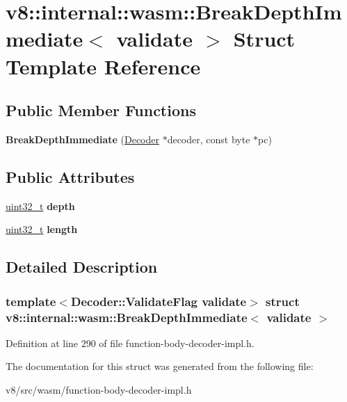 \hypertarget{structv8_1_1internal_1_1wasm_1_1BreakDepthImmediate}{}\section{v8\+:\+:internal\+:\+:wasm\+:\+:Break\+Depth\+Immediate$<$ validate $>$ Struct Template Reference}
\label{structv8_1_1internal_1_1wasm_1_1BreakDepthImmediate}
\subsection*{Public Member Functions}
\begin{DoxyCompactItemize}
\item 
\mbox{\label{structv8_1_1internal_1_1wasm_1_1BreakDepthImmediate_abfe101e58e47896fd47742be90e2eb39}} 
{\bfseries Break\+Depth\+Immediate} (\mbox{\hyperlink{classv8_1_1internal_1_1wasm_1_1Decoder}{Decoder}} $\ast$decoder, const byte $\ast$pc)
\end{DoxyCompactItemize}
\subsection*{Public Attributes}
\begin{DoxyCompactItemize}
\item 
\mbox{\label{structv8_1_1internal_1_1wasm_1_1BreakDepthImmediate_ae01d466da16cd4efc9dd8dc558abdfbc}} 
\mbox{\hyperlink{classuint32__t}{uint32\+\_\+t}} {\bfseries depth}
\item 
\mbox{\label{structv8_1_1internal_1_1wasm_1_1BreakDepthImmediate_a81269a1102fd33da25f5a98bd2b7bd3b}} 
\mbox{\hyperlink{classuint32__t}{uint32\+\_\+t}} {\bfseries length}
\end{DoxyCompactItemize}


\subsection{Detailed Description}
\subsubsection*{template$<$Decoder\+::\+Validate\+Flag validate$>$\newline
struct v8\+::internal\+::wasm\+::\+Break\+Depth\+Immediate$<$ validate $>$}



Definition at line 290 of file function-\/body-\/decoder-\/impl.\+h.



The documentation for this struct was generated from the following file\+:\begin{DoxyCompactItemize}
\item 
v8/src/wasm/function-\/body-\/decoder-\/impl.\+h\end{DoxyCompactItemize}
